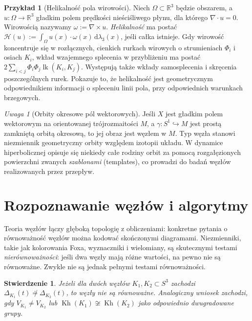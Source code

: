 \documentclass[11pt,a4paper]{report}
\numberwithin{equation}{section}
\theoremstyle{plain}
\newtheorem{stwierdzenie}[twierdzenie]{Stwierdzenie}
\theoremstyle{definition}
\newtheorem{przyklad}[twierdzenie]{Przykład}
\theoremstyle{remark}
\newtheorem{uwaga}[twierdzenie]{Uwaga}
\begin{document}
\begin{przyklad}[Helikalność pola wirowości]
Niech $\Omega\subset\mathbb R^3$ będzie obszarem,
a $u\colon\Omega\to\mathbb R^3$ gładkim polem prędkości
nieściśliwego płynu, dla którego
$\nabla\cdot u=0$. Wirowością nazywamy
$\omega:=\nabla\times u$.
\emph{Helikalność} ma postać
$\mathcal H(u):=\int_\Omega u(x)\cdot\omega(x)\,
\mathrm d\lambda_3(x)$, jeśli całka istnieje.
Gdy wirowość koncentruje się w rozłącznych, cienkich
rurkach wirowych o strumieniach $\Phi_i$ i osiach
$K_i$, wkład wzajemnego splecenia w przybliżeniu
ma postać $2\sum_{i<j}\Phi_i\Phi_j\operatorname{lk}(K_i,K_j)$.
Występują także wkłady samosplecenia i skręcenia
poszczególnych rurek. Pokazuje to, że helikalność jest
geometrycznym odpowiednikiem informacji o spleceniu
linii pola, przy odpowiednich warunkach brzegowych.
\end{przyklad}

\begin{uwaga}[Orbity okresowe pól wektorowych]
Jeśli $X$ jest gładkim polem wektorowym na orientowanej
trójrozmaitości $M$, a $\gamma\colon S^1\hookrightarrow M$
jest prostą zamkniętą orbitą okresową, to jej obraz
jest węzłem w $M$. Typ węzła stanowi niezmiennik
geometryczny orbity względem izotopii układu.
W dynamice hiperbolicznej opisuje się niekiedy całe rodziny
orbit za pomocą rozgałęzionych powierzchni zwanych
\emph{szablonami} (templates), co prowadzi do badań
węzłów realizowanych przez przepływ.
\end{uwaga}

\section{Rozpoznawanie węzłów i algorytmy}
\label{sec:kt-algorytmy}

Teoria węzłów łączy głęboką topologię z obliczeniami:
konkretne pytania o równoważność węzłów można kodować
skończonymi diagramami. Niezmienniki, takie jak kolorowania
Foxa, wyznaczniki i wielomiany, są skutecznymi testami
\emph{nierównoważności}: jeśli dwa węzły mają różne wartości,
na pewno nie są równoważne. Zwykle nie są jednak pełnymi
testami równoważności.

\begin{stwierdzenie}
Jeżeli dla dwóch węzłów $K_1,K_2\subset S^3$ zachodzi
$\Delta_{K_1}(t)\not\doteq\Delta_{K_2}(t)$, to węzły
nie są równoważne. Analogiczny wniosek zachodzi,
gdy $V_{K_1}\ne V_{K_2}$ lub
$\operatorname{Kh}(K_1)\not\cong\operatorname{Kh}(K_2)$
jako odpowiednio dwugradowane grupy.
\end{stwierdzenie}
\end{document}
